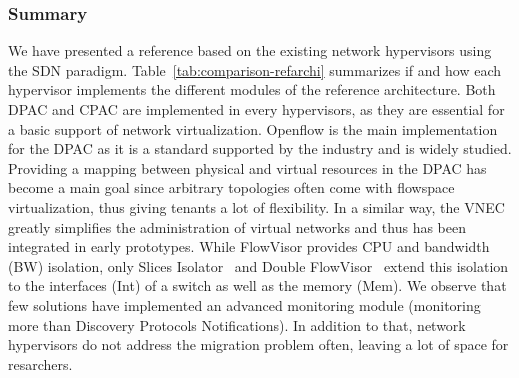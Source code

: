 \subsubsection{Summary}
We have presented a reference based on the existing network hypervisors using the SDN paradigm.
Table~\ref{tab:comparison-refarchi} summarizes if and how each hypervisor implements the different modules of the reference architecture.
Both DPAC and CPAC are implemented in every hypervisors, as they are essential for a basic support of network virtualization.
Openflow is the main implementation for the DPAC as it is a standard supported by the industry and is widely studied.
Providing a mapping between physical and virtual resources in the DPAC has become a main goal since arbitrary topologies often come with flowspace virtualization, thus giving tenants a lot of flexibility.
In a similar way, the VNEC greatly simplifies the administration of virtual networks and thus has been integrated in early prototypes.
While FlowVisor provides CPU and bandwidth (BW) isolation, only Slices Isolator~\cite{SlicesIsolator-El-Azzab2011} and Double FlowVisor~\cite{DoubleFV-Yin2013} extend this isolation to the interfaces (Int) of a switch as well as the memory (Mem).
We observe that few solutions have implemented an advanced monitoring module (\ie monitoring more than Discovery Protocols Notifications).
In addition to that, network hypervisors do not address the migration problem often, leaving a lot of space for resarchers.



